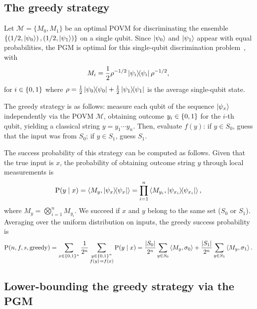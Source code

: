 \subsection{The greedy strategy}

Let $\mathcal{M} = \{M_0, M_1\}$ be an optimal POVM for discriminating the ensemble $\left\{ \left( 1/2, \ket{\psi_0} \right), \left( 1/2, \ket{\psi_1} \right) \right\}$ on a single qubit.
Since $\ket{\psi_0}$ and $\ket{\psi_1}$ appear with equal probabilities, the PGM is optimal for this single-qubit discrimination problem~\cite{hausladen1994pretty}, with
\begin{equation}
    M_i = \frac{1}{2} \rho^{-1/2} \ketbra{\psi_i} \rho^{-1/2},
\end{equation}
for $i \in \{ 0, 1 \}$ where $\rho = \frac{1}{2}\ketbra{\psi_0} + \frac{1}{2}\ketbra{\psi_1}$ is the average single-qubit state.

The greedy strategy is as follows: measure each qubit of the sequence $\ket{\psi_x}$ independently via the POVM $\mathcal{M}$, obtaining outcome $y_i \in \{ 0, 1 \}$ for the $i$-th qubit, yielding a classical string $y = y_1 \cdots y_n$.
Then, evaluate $f(y)$: if $y \in S_0$, guess that the input was from $S_0$; if $y \in S_1$, guess $S_1$.

The success probability of this strategy can be computed as follows.
Given that the true input is $x$, the probability of obtaining outcome string $y$ through local measurements is
\begin{equation}
    \operatorname{P}(y \mid x) = \left\langle M_y, \ketbra{\psi_x} \right\rangle = \prod_{i=1}^n \left\langle M_{y_i}, \ketbra{\psi_{x_i}} \right\rangle,
\end{equation}
where $M_y = \bigotimes_{i=1}^n M_{y_i}$.
We succeed if $x$ and $y$ belong to the same set ($S_0$ or $S_1$).
Averaging over the uniform distribution on inputs, the greedy success probability is
\begin{equation}\label{eq:ch5_qseq-local_success}
    \operatorname{P}(n,f,s,\mathrm{greedy})
    = \sum_{x \in \{ 0, 1 \}^n} \frac{1}{2^n} \sum_{\substack{y \in \{ 0, 1 \}^n \\ f(y)\mspace{2mu} = f(x)}} \operatorname{P}(y \mid x)
    = \frac{\abs{S_0}}{2^n} \sum_{y \in S_0} \left\langle M_y, \sigma_0 \right\rangle + \frac{\abs{S_1}}{2^n} \sum_{y \in S_1} \left\langle M_y, \sigma_1 \right\rangle.
\end{equation}

\subsection{Lower-bounding the greedy strategy via the PGM}\label{subsec:ch5_qseq-greedy=pgm}

